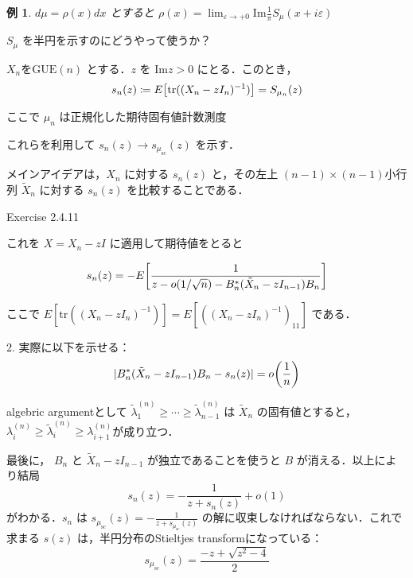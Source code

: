 \documentclass{ltjsarticle}
\theoremstyle{mystyle1}
\theoremstyle{mystyle2}
\newtheorem{example}{例}
\theoremstyle{mystyle3}
\begin{document}
\begin{example}
    $d\mu=\rho(x)dx$ とすると $\rho(x)=\lim_{\varepsilon\to+0}\mathrm{Im}\frac{1}{\pi}S_\mu(x+i\varepsilon)$
\end{example}

$S_\mu$ を半円を示すのにどうやって使うか？

$X_n$を$\mathrm{GUE}(n)$ とする．$z$ を $\mathrm{Im}z>0$ にとる．このとき，
\begin{equation}
    s_n(z)\coloneqq E\mleft[\mathrm{tr}((X_n-zI_n)^{-1})\mright]=S_{\mu_n}(z)
\end{equation}

ここで $\mu_n$ は正規化した期待固有値計数測度

これらを利用して $s_n(z)\to s_{\mu_{\mathrm{sc}}}(z)$ を示す．

メインアイデアは，$X_n$ に対する $s_n(z)$ と，その左上 $(n-1)\times(n-1)$小行列 $\tilde{X}_n$ に対する $s_n(z)$ を比較することである．

Exercise 2.4.11

これを $X=X_n-zI$ に適用して期待値をとると

\begin{equation}
    s_n(z)=-E\mleft[\frac{1}{z-o(1/\sqrt{n})-B_n^*(\tilde{X}_n-zI_{n-1})B_n}\mright]
\end{equation}

ここで $E[\mathrm{tr}((X_n-zI_n)^{-1})]=E[((X_n-zI_n)^{-1})_{11}]$ である．

2. 実際に以下を示せる：
\begin{equation}
    |B_n^*(\tilde{X}_n-zI_{n-1})B_n-s_n(z)|=o\mleft(\frac{1}{n}\mright)
\end{equation}

algebric argumentとして $\tilde{\lambda}^{(n)}_1\geq\cdots\geq\tilde{\lambda}^{(n)}_{n-1}$ は $\tilde{X}_n$ の固有値とすると， $\lambda^{(n)}_i\geq\tilde{\lambda}^{(n)}_i\geq\lambda^{(n)}_{i+1}$が成り立つ．

最後に， $B_n$ と $\tilde{X}_n-zI_{n-1}$ が独立であることを使うと $B$ が消える．以上により結局
\begin{equation}
    s_n(z)=-\frac{1}{z+s_n(z)}+o(1)
\end{equation}
がわかる．$s_n$ は $s_{\mu_{\mathrm{sc}}}(z)=-\frac{1}{z+s_{\mu_{\mathrm{sc}}}(z)}$ の解に収束しなければならない．これで求まる $s(z)$ は，半円分布のStieltjes transformになっている：
\begin{equation}
    s_{\mu_{\mathrm{sc}}}(z)=\frac{-z+\sqrt{z^2-4}}{2}
\end{equation}
\end{document}
